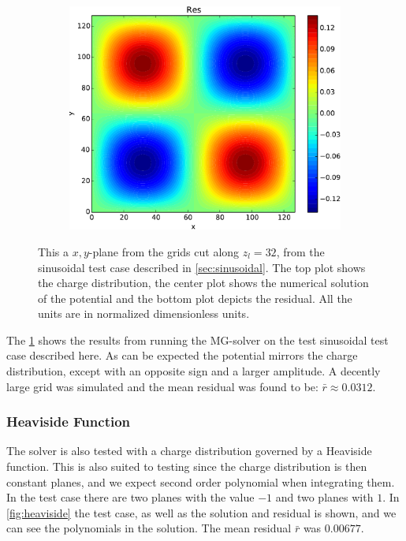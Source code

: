 \begin{figure}
\begin{subfigure}[b]{0.6\textwidth}
				\includegraphics[width = \textwidth]{figures/verification/analytical/sinusoidal/residual.pdf}
			\end{subfigure}
		\caption{This a \(x,y\)-plane from the grids cut along \(z_l = 32\), from the sinusoidal test case described in \cref{sec:sinusoidal}.
		The top plot shows the charge distribution, the center plot shows the numerical solution of the potential and the bottom plot depicts
		the residual. All the units are in normalized dimensionless units.}
		\label{fig:sinusoidal}
	\end{figure}

	The \cref{fig:sinusoidal} shows the results from running the MG-solver on the test sinusoidal test case described here.
	As can be expected the potential mirrors the charge distribution, except with an opposite sign and a larger amplitude.
	A decently large grid was simulated and the mean residual was found to be: \(\bar{r} \approx 0.0312\).


	\subsubsection{Heaviside Function}
		The solver is also tested with a charge distribution governed by a Heaviside
		function. This is also suited to testing since the charge distribution is then
		constant planes, and we expect second order polynomial when integrating them.
		In the test case there are two planes with the value \(-1\) and two
		planes with \(1\). In \cref{fig:heaviside} the test case, as well as the solution and residual is
		shown, and we can see the polynomials in the solution. The mean residual \(\bar{r}\) was
		\(0.00677\).

